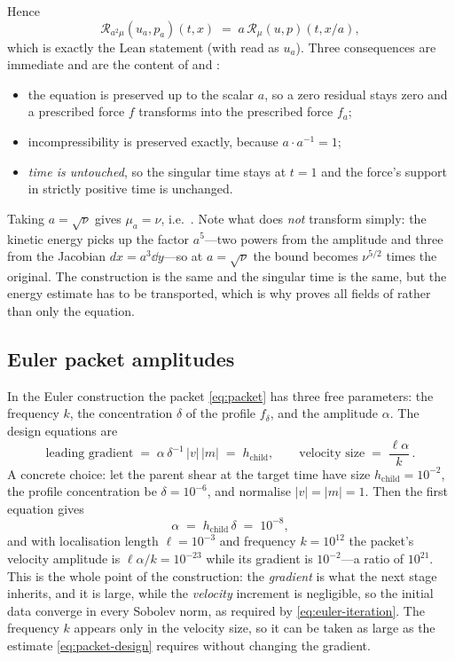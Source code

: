 Hence
\[
\mathcal{R}_{a^2\mu}(u_a,p_a)(t,x) \;=\; a\,\mathcal{R}_\mu(u,p)(t,x/a),
\]
which is exactly the Lean statement 
(with  read as $u_a$). Three consequences are immediate and are the
content of  and :

\begin{itemize}
\item the equation is preserved up to the scalar $a$, so a zero residual stays zero and a
      prescribed force $f$ transforms into the prescribed force $f_a$;
\item incompressibility is preserved exactly, because $a\cdot a^{-1}=1$;
\item \emph{time is untouched}, so the singular time stays at $t=1$ and the force's support
      in strictly positive time is unchanged.
\end{itemize}

Taking $a=\sqrt\nu$ gives $\mu_a=\nu$, i.e.\ .
Note what does \emph{not} transform simply: the kinetic energy picks up the factor
$a^5$---two powers from the amplitude and three from the Jacobian $dx=a^3\dd y$---so at
$a=\sqrt\nu$ the bound becomes $\nu^{5/2}$ times the original. The construction is the same
and the singular time is the same, but the energy estimate has to be transported, which is
why  proves all fields of  rather than
only the equation.

\subsection{Euler packet amplitudes}
\label{ex:packet}

In the Euler construction the packet \eqref{eq:packet} has three free parameters: the
frequency $k$, the concentration $\delta$ of the profile $f_\delta$, and the amplitude
$\alpha$. The design equations are
\begin{equation}
\text{leading gradient} \;=\; \alpha\,\delta^{-1}\,|v|\,|m| \;=\; h_{\text{child}},
\qquad
\text{velocity size} \;=\; \frac{\ell\alpha}{k}\,.
\label{eq:packet-design}
\end{equation}
A concrete choice: let the parent shear at the target time have size
$h_{\text{child}}=10^{-2}$, the profile concentration be $\delta=10^{-6}$, and normalise
$|v|=|m|=1$. Then the first equation gives
\[
\alpha \;=\; h_{\text{child}}\,\delta \;=\; 10^{-8},
\]
and with localisation length $\ell=10^{-3}$ and frequency $k=10^{12}$ the packet's velocity
amplitude is $\ell\alpha/k=10^{-23}$ while its gradient is $10^{-2}$---a ratio of
$10^{21}$. This is the whole point of the construction: the \emph{gradient} is what the next
stage inherits, and it is large, while the \emph{velocity} increment is negligible, so the
initial data converge in every Sobolev norm, as required by
\eqref{eq:euler-iteration}. The frequency $k$ appears only in the velocity size, so it can
be taken as large as the estimate \eqref{eq:packet-design} requires without changing the
gradient.

